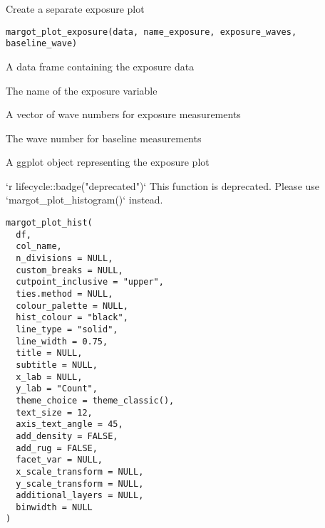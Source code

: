 \documentclass[a4paper]{book}
\begin{document}
%
\begin{Description}
Create a separate exposure plot
\end{Description}
%
\begin{Usage}
\begin{verbatim}
margot_plot_exposure(data, name_exposure, exposure_waves, baseline_wave)
\end{verbatim}
\end{Usage}
%
\begin{Arguments}
\begin{ldescription}
\item[\code{data}] A data frame containing the exposure data

\item[\code{name\_exposure}] The name of the exposure variable

\item[\code{exposure\_waves}] A vector of wave numbers for exposure measurements

\item[\code{baseline\_wave}] The wave number for baseline measurements
\end{ldescription}
\end{Arguments}
%
\begin{Value}
A ggplot object representing the exposure plot
\end{Value}
%
\begin{Description}
`r lifecycle::badge("deprecated")`
This function is deprecated. Please use `margot\_plot\_histogram()` instead.
\end{Description}
%
\begin{Usage}
\begin{verbatim}
margot_plot_hist(
  df,
  col_name,
  n_divisions = NULL,
  custom_breaks = NULL,
  cutpoint_inclusive = "upper",
  ties.method = NULL,
  colour_palette = NULL,
  hist_colour = "black",
  line_type = "solid",
  line_width = 0.75,
  title = NULL,
  subtitle = NULL,
  x_lab = NULL,
  y_lab = "Count",
  theme_choice = theme_classic(),
  text_size = 12,
  axis_text_angle = 45,
  add_density = FALSE,
  add_rug = FALSE,
  facet_var = NULL,
  x_scale_transform = NULL,
  y_scale_transform = NULL,
  additional_layers = NULL,
  binwidth = NULL
)
\end{verbatim}
\end{Usage}
\end{document}
